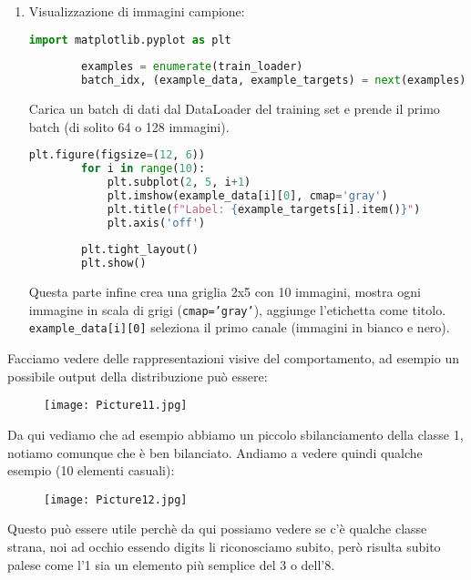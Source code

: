 \documentclass[a4paper,12pt]{article}
\begin{document}
\begin{enumerate}
    \item Visualizzazione di immagini campione:
    \begin{lstlisting}[language=Python, basicstyle=\ttfamily\footnotesize, breaklines=true, frame=single]
        import matplotlib.pyplot as plt
        
        examples = enumerate(train_loader)
        batch_idx, (example_data, example_targets) = next(examples)
    \end{lstlisting}
    Carica un batch di dati dal DataLoader del training set e prende il primo batch (di solito 64 o 128 immagini).
    
    \begin{lstlisting}[language=Python, basicstyle=\ttfamily\footnotesize, breaklines=true, frame=single]
        plt.figure(figsize=(12, 6))
        for i in range(10):
            plt.subplot(2, 5, i+1)
            plt.imshow(example_data[i][0], cmap='gray')
            plt.title(f"Label: {example_targets[i].item()}")
            plt.axis('off')
        
        plt.tight_layout()
        plt.show()
    \end{lstlisting}
    Questa parte infine crea una griglia 2x5 con 10 immagini, mostra ogni immagine in scala di grigi (\texttt{cmap='gray'}), aggiunge l'etichetta come titolo. 
    \newline
    \texttt{example\_data[i][0]} seleziona il primo canale (immagini in bianco e nero).
\end{enumerate}
Facciamo vedere delle rappresentazioni visive del comportamento, ad esempio un possibile output della distribuzione può essere:
\begin{figure}[H]
    \centering
    \texttt{[image: Picture11.jpg]}
    \label{etichetta33}
\end{figure}
\noindent Da qui vediamo che ad esempio abbiamo un piccolo sbilanciamento della classe 1, notiamo comunque che è ben bilanciato.
Andiamo a vedere quindi qualche esempio (10 elementi casuali):
\begin{figure}[H]
    \centering
    \texttt{[image: Picture12.jpg]}
    \label{etichetta34}
\end{figure}
\noindent Questo può essere utile perchè da qui possiamo vedere se c'è qualche classe strana, noi ad occhio essendo digits li riconosciamo subito, però risulta subito palese come l'1 sia 
un elemento più semplice del 3 o dell'8.
\end{document}

